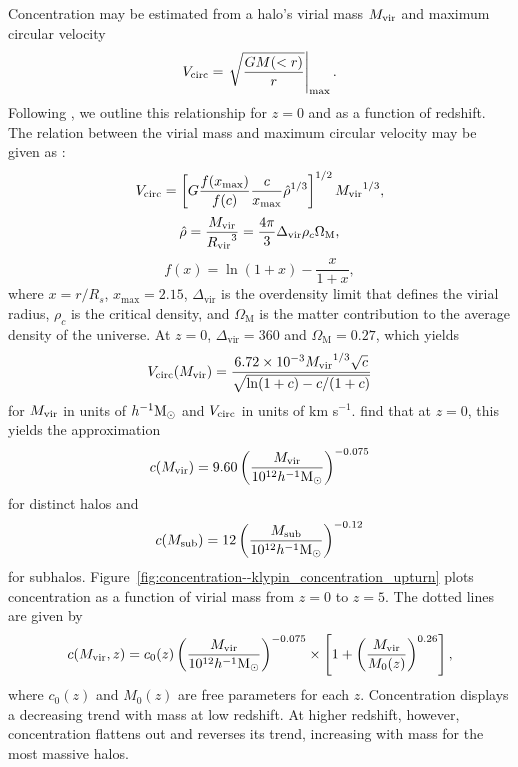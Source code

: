 Concentration may be estimated from a halo's virial mass ${M_{\mathrm{vir}}}$ and maximum circular velocity
\begin{equation}
	{V_{\mathrm{circ}}} = \left. \sqrt{\frac{GM(<r)}{r}} \right|_{\mathrm{\max}}.
\end{equation}
Following \citet{2011ApJ...740..102K}, we outline this relationship for $z = 0$ and as a function of redshift.  The relation between the virial mass and maximum circular velocity may be given as \citep{2001ApJ...554..903K}:
\begin{equation}
	{V_{\mathrm{circ}}} = \left[ G \frac{f(x_{\max})}{f(c)} \frac{c}{x_{\max}} \hat{\rho}^{1/3} \right]^{1/2} {M_{\mathrm{vir}}}^{1/3},
\end{equation}
\begin{equation}
	\hat{\rho} = \frac{{M_{\mathrm{vir}}}}{{R_{\mathrm{vir}}}^{3}} = \frac{4 \pi}{3} \Delta_{\mathrm{vir}} \rho_{c} \Omega_{\mathrm{M}},
\end{equation}
\begin{equation}
	f(x) = \ln(1 + x) - \frac{x}{1 + x},
\end{equation}
where $x = r / R_{s}$, $x_{\max} = 2.15$, $\Delta_{\mathrm{vir}}$ is the overdensity limit that defines the virial radius, $\rho_{c}$ is the critical density, and $\Omega_{\mathrm{M}}$ is the matter contribution to the average density of the universe.  At $z = 0$, $\Delta_{\mathrm{vir}} = 360$ and $\Omega_{\mathrm{M}} = 0.27$, which yields
\begin{equation}
	{V_{\mathrm{circ}}}({M_{\mathrm{vir}}}) = \frac{6.72 \times 10^{-3} {M_{\mathrm{vir}}}^{1/3} \sqrt{c}}{\sqrt{\ln(1 + c) - c / (1 + c)}}
\end{equation}
for ${M_{\mathrm{vir}}}$ in units of $h^{-1} {\rm M_\odot}$ and ${V_{\mathrm{circ}}}$ in units of km s$^{-1}$.  \citet{2011ApJ...740..102K} find that at $z = 0$, this yields the approximation
\begin{equation}
	c({M_{\mathrm{vir}}}) = 9.60 \left( \frac{{M_{\mathrm{vir}}}}{10^{12} h^{-1} {\rm M_\odot}} \right)^{-0.075}
\end{equation}
for distinct halos and
\begin{equation}
	c(M_{\mathrm{sub}}) = 12 \left( \frac{M_{\mathrm{sub}}}{10^{12} h^{-1} {\rm M_\odot}} \right)^{-0.12}
\end{equation}
for subhalos.  Figure~\ref{fig:concentration--klypin_concentration_upturn} plots concentration as a function of virial mass from $z = 0$ to $z = 5$.  The dotted lines are given by
\begin{equation} \label{eq:concentration_mass_upturn}
	c({M_{\mathrm{vir}}},z) = c_{0}(z) \left( \frac{{M_{\mathrm{vir}}}}{10^{12} h^{-1} {\rm M_\odot}} \right)^{-0.075} \times \left[ 1 + \left( \frac{{M_{\mathrm{vir}}}}{M_{0}(z)} \right)^{0.26} \right],
\end{equation}
where $c_{0}(z)$ and $M_{0}(z)$ are free parameters for each $z$.  Concentration displays a decreasing trend with mass at low redshift.  At higher redshift, however, concentration flattens out and reverses its trend, increasing with mass for the most massive halos.

